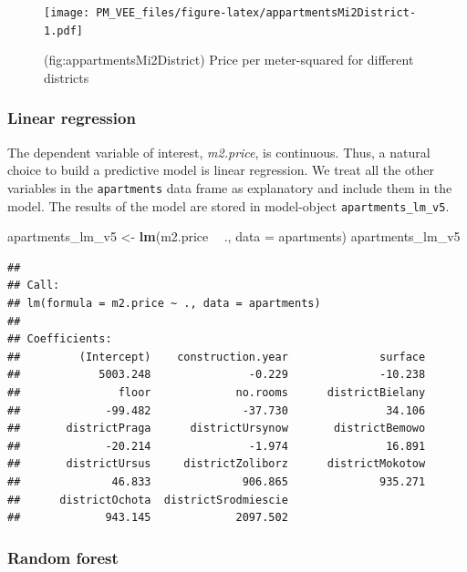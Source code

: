 \documentclass[12pt,]{krantz}
\newenvironment{Shaded}{\begin{snugshade}}{\end{snugshade}}
\newcommand{\DataTypeTok}[1]{\textcolor[rgb]{0.13,0.29,0.53}{#1}}
\newcommand{\KeywordTok}[1]{\textcolor[rgb]{0.13,0.29,0.53}{\textbf{#1}}}
\newcommand{\NormalTok}[1]{#1}
\newcommand{\OperatorTok}[1]{\textcolor[rgb]{0.81,0.36,0.00}{\textbf{#1}}}
\newcommand{\StringTok}[1]{\textcolor[rgb]{0.31,0.60,0.02}{#1}}
\begin{document}
\begin{figure}
\centering
\texttt{[image: PM\_VEE\_files/figure-latex/appartmentsMi2District-1.pdf]}
\caption{\label{fig:appartmentsMi2District}(fig:appartmentsMi2District) Price per meter-squared for different districts}
\end{figure}

\hypertarget{model-Apartments-lr}{%
\subsubsection{Linear regression}\label{model-Apartments-lr}}

The dependent variable of interest, \emph{m2.price}, is continuous. Thus, a natural choice to build a predictive model is linear regression. We treat all the other variables in the \texttt{apartments} data frame as explanatory and include them in the model. The results of the model are stored in model-object \texttt{apartments\_lm\_v5}.

\begin{Shaded}
\begin{Highlighting}[]
\NormalTok{apartments_lm_v5 <-}\StringTok{ }\KeywordTok{lm}\NormalTok{(m2.price }\OperatorTok{~}\StringTok{ }\NormalTok{., }\DataTypeTok{data =}\NormalTok{ apartments)}
\NormalTok{apartments_lm_v5}
\end{Highlighting}
\end{Shaded}

\begin{verbatim}
## 
## Call:
## lm(formula = m2.price ~ ., data = apartments)
## 
## Coefficients:
##         (Intercept)    construction.year              surface  
##            5003.248               -0.229              -10.238  
##               floor             no.rooms      districtBielany  
##             -99.482              -37.730               34.106  
##       districtPraga      districtUrsynow       districtBemowo  
##             -20.214               -1.974               16.891  
##       districtUrsus     districtZoliborz      districtMokotow  
##              46.833              906.865              935.271  
##      districtOchota  districtSrodmiescie  
##             943.145             2097.502
\end{verbatim}

\hypertarget{model-Apartments-rf}{%
\subsubsection{Random forest}\label{model-Apartments-rf}}
\end{document}
